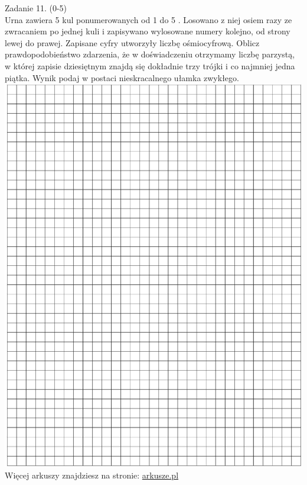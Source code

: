 \documentclass[10pt]{article}
\begin{document}
Zadanie 11. (0-5)\\
Urna zawiera 5 kul ponumerowanych od 1 do 5 . Losowano z niej osiem razy ze zwracaniem po jednej kuli i zapisywano wylosowane numery kolejno, od strony lewej do prawej. Zapisane cyfry utworzyły liczbę ośmiocyfrową. Oblicz prawdopodobieństwo zdarzenia, że w doświadczeniu otrzymamy liczbę parzystą, w której zapisie dziesiętnym znajdą się dokładnie trzy trójki i co najmniej jedna piątka. Wynik podaj w postaci nieskracalnego ułamka zwykłego.\\
\includegraphics[max width=\textwidth, center]{2024_11_21_a7a52c0c0974ad42b88bg-08}\\
Więcej arkuszy znajdziesz na stronie: \href{http://arkusze.pl}{arkusze.pl}\\
\end{document}

